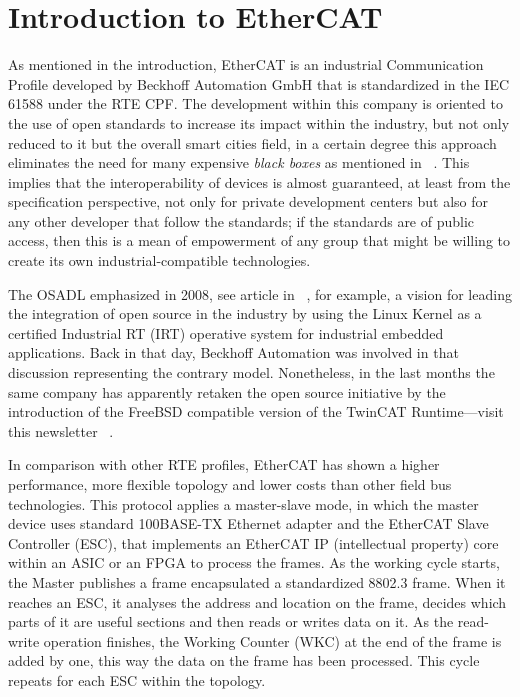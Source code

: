 \chapter{Introduction to EtherCAT}\label{sec:ecat_protocol}

As mentioned in the introduction, EtherCAT is an industrial Communication Profile developed by Beckhoff Automation GmbH that is 
standardized in the IEC 61588 under the RTE CPF. The development within this company is oriented to the use of 
open standards to increase its impact within the industry, but not only reduced to it but the overall smart cities field, in
a certain degree this approach eliminates the need for many expensive \emph{black boxes} as mentioned in ~\cite{beckhoff_automation}. %
This implies that the interoperability of devices is almost guaranteed, at least from the specification perspective,
not only for private development centers but also for any other developer that follow the standards; if the standards 
are of public access, then this is a mean of empowerment of any group that might be willing
to create its own industrial-compatible technologies.

The OSADL emphasized in 2008, see article in ~\cite{beckhoff_vs_osadl}, for example, a vision for leading the integration
of open source in the industry by using the Linux Kernel as a certified Industrial RT (IRT) operative system for industrial embedded applications. 
Back in that day, Beckhoff Automation was involved in that discussion representing the contrary model. Nonetheless, in the last months the same company has
apparently retaken the open source initiative by the introduction of the FreeBSD compatible version of the TwinCAT Runtime---visit this newsletter ~\cite{beckhoff_freebsd}.%

In comparison with other RTE profiles, EtherCAT has shown a higher performance, more flexible topology and lower costs than other field bus 
technologies. This  protocol  applies  a  master-slave  mode,  in  which  the  master  
device  uses  standard  100BASE-TX  Ethernet  adapter  and  the  EtherCAT  Slave  Controller (ESC), that implements an EtherCAT IP 
(intellectual property) core within an ASIC or an FPGA to process the frames. As  the  working  cycle starts, the  Master  
publishes a frame encapsulated a standardized 8802.3 frame. When it reaches an ESC, it analyses the address and location on the frame, decides
which parts of it are useful sections and then reads or writes data on it. As the
read-write operation finishes, the Working Counter (WKC) at the end of the frame is added by one, this way the data on the frame has been processed. 
This cycle repeats for each ESC within the topology. %

